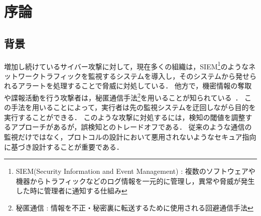 \section{序論}
\subsection{背景}
増加し続けているサイバー攻撃に対して，現在多くの組織は，SIEM\footnote{SIEM(Security Information and Event Management) : 複数のソフトウェアや機器からトラフィックなどのログ情報を一元的に管理し，異常や脅威が発生した時に管理者に通知する仕組み}のようなネットワークトラフィックを監視するシステムを導入し，そのシステムから発せられるアラートを処理することで脅威に対処している．
他方で，機密情報の奪取や諜報活動を行う攻撃者は，秘匿通信手法\footnote{秘匿通信 : 情報を不正・秘密裏に転送するために使用される回避通信手法}を用いることが知られている~\cite{mitre-custom-c2}．
この手法を用いることによって，実行者は先の監視システムを迂回しながら目的を実行することができる．
このような攻撃に対処するには，検知の閾値を調整するアプローチがあるが，誤検知とのトレードオフである．
従来のような通信の監視だけではなく，プロトコルの設計において悪用されないようなセキュア指向に基づき設計することが重要である．

